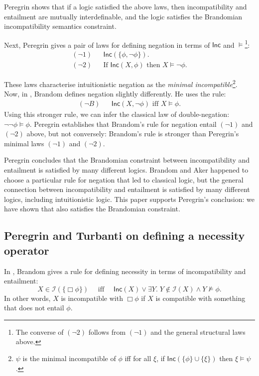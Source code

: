 \NI Peregrin shows that if a logic satisfied the above laws, then
incompatibility and entailment are mutually interdefinable, and the
logic satisfies the Brandomian incompatibility semantics constraint.

Next, Peregrin gives a pair of laws for defining negation in terms
of $\mathsf{Inc}$ and $\models$\footnote{The converse of $(\neg 2)$
  follows from $(\neg 1)$ and the general structural laws above.}:
\begin{eqnarray*}
  (\neg 1) & & \mathsf{Inc}(\{\phi, \neg \phi\}). \\
  (\neg 2) & & \text{If } \mathsf{Inc}(X, \phi) \text{ then } X \models \neg \phi.
\end{eqnarray*}

\NI These laws characterise intuitionistic negation as the
\emph{minimal incompatible}\footnote{$\psi$ is the minimal
  incompatible of $\phi$ iff for all $\xi$, if $\mathsf{Inc}(\{\phi\}
  \cup \{\xi\})$ then $\xi \models \psi$.}.  
  Now, in \cite{brandom},
Brandom defines negation slightly differently. He uses the rule:
\begin{eqnarray*}
  (\neg B) & &\mathsf{Inc}(X, \neg \phi) \text{ iff } X \models \phi.
\end{eqnarray*}
Using this stronger rule, we can infer the classical law of
double-negation: $\neg \neg \phi \models \phi$.  Peregrin establishes
that Brandom's rule for negation entail $(\neg 1)$ and $(\neg 2)$
above, but not conversely: Brandom's rule is stronger than Peregrin's
minimal laws $(\neg 1)$ and $(\neg 2)$.

Peregrin concludes that the Brandomian constraint between
incompatibility and entailment is satisfied by many different logics.
Brandom and Aker happened to choose a particular rule for negation
that led to classical logic, but the general connection between
incompatibility and entailment is satisfied by many different logics,
including intuitionistic logic.  This paper supports Peregrin's
conclusion: we have shown that \cathoristic{} also satisfies the
Brandomian constraint.

\subsection{Peregrin and Turbanti on defining a necessity operator}\label{peregrinTurbanti}

In \cite{brandom}, Brandom gives a rule for defining necessity in terms of incompatibility and entailment:
\[
X \in \mathcal{I}(\{\Box \phi\}) \quad\text{ iff }\quad \mathsf{Inc}(X) \lor \exists Y . \; Y \notin \mathcal{I}(X) \land Y \nvDash \phi.
\]
In other words, $X$ is incompatible with $\Box \phi$ if $X$ is compatible with something that does not entail $\phi$.

